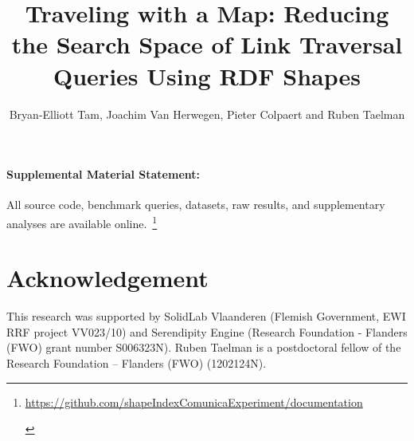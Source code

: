\documentclass[Afour,sageh,times]{sagej}
\newif\ifanonymous
\begin{document}

\title{Traveling with a Map: Reducing the Search Space of Link Traversal Queries Using RDF Shapes}
\ifanonymous
      \author{Anonymous}
    \else
      \author{Bryan-Elliott Tam, Joachim Van Herwegen, Pieter Colpaert and Ruben Taelman}



   \fi 





\maketitle










\paragraph*{Supplemental Material Statement:}\label{sec:supplementalMaterial} All source code, benchmark queries, datasets, raw results, and supplementary analyses are available online.~\footnote{
    \ifanonymous
       \url{https://anonymous.4open.science/r/documentation-1A65}
    \else
       \url{https://github.com/shapeIndexComunicaExperiment/documentation}
    \fi 
    \label{sf:supplementalMaterial}}

\section{Acknowledgement}

This research was supported by SolidLab Vlaanderen (Flemish Government, EWI RRF project VV023/10) and Serendipity Engine (Research Foundation - Flanders (FWO) grant number S006323N).
Ruben Taelman is a postdoctoral fellow of the Research Foundation – Flanders (FWO) (1202124N).

\printbibliography
{}


\end{document}
